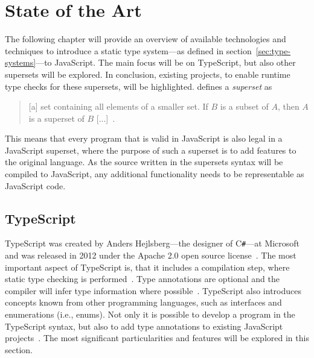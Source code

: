 
\chapter{State of the Art}
\label{cha:state-of-the-art}

The following chapter will provide an overview of available technologies and techniques to introduce a static type system---as defined in section~\ref{sec:type-systems}---to JavaScript. The main focus will be on TypeScript, but also other supersets will be explored. In conclusion, existing projects, to enable runtime type checks for these supersets, will be highlighted. \citeauthor{Term:Superset} defines a \emph{superset} as 
\begin{quote}
   [a] set containing all elements of a smaller set. If $B$ is a subset of $A$, then $A$ is a superset of $B$ [...]~\cite{Term:Superset}.
\end{quote}
This means that every program that is valid in JavaScript is also legal in a JavaScript superset, where the purpose of such a superset is to add features to the original language. As the source written in the supersets syntax will be compiled to JavaScript, any additional functionality needs to be representable as JavaScript code.

\section{TypeScript}
\label{sec:typescript}

TypeScript was created by Anders Hejlsberg---the designer of C\texttt{\#}---at Microsoft~\cite[p.~10]{MasteringTypeScript:Rozentals:2017} and was released in 2012 under the Apache 2.0 open source license~\cite[p.~xix]{ProTypeScript:Fenton:2014}. The most important aspect of TypeScript is, that it includes a compilation step, where static type checking is performed~\cite[p.~11]{MasteringTypeScript:Rozentals:2017}. Type annotations are optional and the compiler will infer type information where possible~\cite[p.~10]{TypeScriptBook:Syed:2017}. TypeScript also introduces concepts known from other programming languages, such as interfaces and enumerations (i.e., enums). Not only it is possible to develop a program in the TypeScript syntax, but also to add type annotations to existing JavaScript projects~\cite[p.~13]{MasteringTypeScript:Rozentals:2017}. The most significant particularities and features will be explored in this section.


